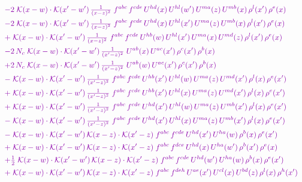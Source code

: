 \documentclass[10pt]{article}
\numberwithin{equation}{section}
\begin{document}
\begin{align}
&\quad{\color{CC}-2\;\mathcal{K}(x-w)\cdot\mathcal{K}(x'-w')\,\tfrac{1}{(x-z)^{2}}\;f^{abc}\,f^{cde}\,U^{hd}(x)\,U^{hl}(w')\,U^{ma}(z)\,U^{mb}(x)\,\rho^{l}(x')\,\rho^{e}(x)}\notag\\
&\quad{\color{CC}-2\;\mathcal{K}(x-w)\cdot\mathcal{K}(x'-w')\,\tfrac{1}{(x-z)^{2}}\;f^{abc}\,f^{cde}\,U^{hd}(x)\,U^{hl}(x')\,U^{ma}(z)\,U^{mb}(x)\,\rho^{l}(x')\,\rho^{e}(x)}\notag\\
&\quad{\color{CC}+\;\mathcal{K}(x-w)\cdot\mathcal{K}(x'-w')\,\tfrac{1}{(x-z)^{2}}\;f^{abc}\,f^{cde}\,U^{hb}(w)\,U^{hl}(x')\,U^{ma}(x)\,U^{md}(z)\,\rho^{l}(x')\,\rho^{e}(x)}\notag\\
&\quad{\color{CC}-2\,N_c\;\mathcal{K}(x-w)\cdot\mathcal{K}(x'-w')\,\tfrac{1}{(x'-z)^{2}}\;U^{ab}(x)\,U^{ac}(x')\,\rho^{c}(x')\,\rho^{b}(x)}\notag\\
&\quad{\color{CC}+2\,N_c\;\mathcal{K}(x-w)\cdot\mathcal{K}(x'-w')\,\tfrac{1}{(x'-z)^{2}}\;U^{ab}(w)\,U^{ac}(x')\,\rho^{c}(x')\,\rho^{b}(x)}\notag\\
&\quad{\color{CC}-\;\mathcal{K}(x-w)\cdot\mathcal{K}(x'-w')\,\tfrac{1}{(x'-z)^{2}}\;f^{abc}\,f^{cde}\,U^{hb}(x')\,U^{hl}(w)\,U^{ma}(z)\,U^{md}(x')\,\rho^{l}(x)\,\rho^{e}(x')}\notag\\
&\quad{\color{CC}+\;\mathcal{K}(x-w)\cdot\mathcal{K}(x'-w')\,\tfrac{1}{(x'-z)^{2}}\;f^{abc}\,f^{cde}\,U^{hb}(x')\,U^{hl}(x)\,U^{ma}(z)\,U^{md}(x')\,\rho^{l}(x)\,\rho^{e}(x')}\notag\\
&\quad{\color{CC}+\;\mathcal{K}(x-w)\cdot\mathcal{K}(x'-w')\,\tfrac{1}{(x'-z)^{2}}\;f^{abc}\,f^{cde}\,U^{hd}(x')\,U^{hl}(w)\,U^{ma}(z)\,U^{mb}(x')\,\rho^{l}(x)\,\rho^{e}(x')}\notag\\
&\quad{\color{CC}-\;\mathcal{K}(x-w)\cdot\mathcal{K}(x'-w')\,\tfrac{1}{(x'-z)^{2}}\;f^{abc}\,f^{cde}\,U^{hd}(x')\,U^{hl}(x)\,U^{ma}(z)\,U^{mb}(x')\,\rho^{l}(x)\,\rho^{e}(x')}\notag\\
&\quad{\color{CC}-\;\mathcal{K}(x-w)\cdot\mathcal{K}(x'-w')\,\mathcal{K}(x-z)\cdot\mathcal{K}(x'-z)\;f^{abc}\,f^{cde}\,U^{hd}(x')\,U^{ha}(w)\,\rho^{b}(x)\,\rho^{e}(x')}\notag\\
&\quad{\color{CC}+\;\mathcal{K}(x-w)\cdot\mathcal{K}(x'-w')\,\mathcal{K}(x-z)\cdot\mathcal{K}(x'-z)\;f^{abc}\,f^{dce}\,U^{hd}(x)\,U^{ha}(w')\,\rho^{b}(x')\,\rho^{e}(x)}\notag\\
&\quad{\color{CC}+\tfrac{1}{2}\;\mathcal{K}(x-w)\cdot\mathcal{K}(x'-w')\,\mathcal{K}(x-z)\cdot\mathcal{K}(x'-z)\;f^{abc}\,f^{cde}\,U^{hd}(w')\,U^{ha}(w)\,\rho^{b}(x)\,\rho^{e}(x')}\notag\\
&\quad{\color{CC}+\;\mathcal{K}(x-w)\cdot\mathcal{K}(x'-w')\,\mathcal{K}(x-z)\cdot\mathcal{K}(x'-z)\;f^{abc}\,f^{deh}\,U^{ae}(x')\,U^{cl}(x)\,U^{bd}(z)\,\rho^{l}(x)\,\rho^{h}(x')}\notag\\

\end{align}
\end{document}

